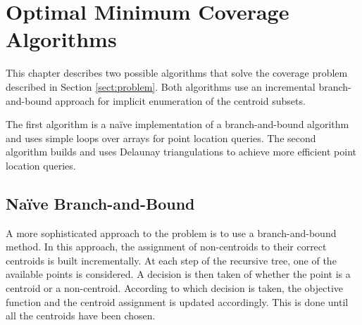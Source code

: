 \chapter{Optimal Minimum Coverage Algorithms}
\label{chap:algos}

This chapter describes two possible algorithms that solve the coverage problem described in Section \ref{sect:problem}. Both algorithms use an incremental branch-and-bound approach for implicit enumeration of the centroid subsets. 

The first algorithm is a naïve implementation of a branch-and-bound algorithm and uses simple loops over arrays for point location queries. The second algorithm builds and uses Delaunay triangulations to achieve more efficient point location queries.

\section{Naïve Branch-and-Bound}
\label{alg:bb}

A more sophisticated approach to the problem is to use a branch-and-bound method.
In this approach, the assignment of non-centroids to their correct centroids is built incrementally.
At each step of the recursive tree, one of the available points is considered. A decision is then taken of whether the point is a centroid or a non-centroid. According to which decision is taken, the objective function and the centroid assignment is updated accordingly. This is done until all the centroids have been chosen.

